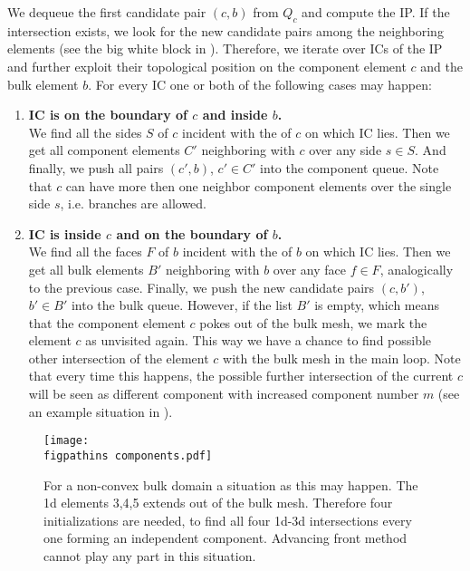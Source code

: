 We dequeue the first candidate pair $(c,b)$ from $Q_c$ and compute the IP.
If the intersection exists, we look for the new candidate pairs among the neighboring elements
(see the big white block in ).
Therefore, we iterate over ICs of the IP and further exploit their topological position on the component element $c$ and the bulk element $b$.
For every IC one or both of the following cases may happen:
\begin{enumerate}[label=(\alph*)]
    \item \textbf{IC is on the boundary of $c$  and inside $b$.} \\
            We find all the sides $S$ of $c$ incident with the \nface of $c$ on which IC lies. Then we get all component
            elements $C'$ neighboring with $c$ over any side $s\in S$. And finally, we push all pairs $(c',b)$, $c'\in C'$ 
            into the component queue. Note that $c$ can have more then one neighbor component elements over the single side $s$, i.e. branches are allowed.
    \item \textbf{IC is inside $c$ and on the boundary of $b$.} \label{enum:prolong2}\\
            We find all the faces $F$ of $b$ incident with the \nface of $b$ on which IC lies. 
            Then we get all bulk elements $B'$ neighboring with $b$ over any face $f\in F$,
            analogically to the previous case.
            Finally, we push the new candidate pairs $(c, b')$, $b'\in B'$ into the bulk queue.
            However, if the list $B'$ is empty, which means that the component element $c$ pokes out of the bulk mesh,
            we mark the element $c$ as unvisited again. This way we have a chance to find possible other intersection of the element
            $c$ with the bulk mesh in the main loop. Note that every time this happens, the possible further intersection 
            of the current $c$ will be seen as different component with increased component number $m$
            (see an example situation in ). 
\end{enumerate}

\begin{figure}[!htb]
    \centering
    \texttt{[image: \\figpathins components.pdf]}
    \caption{For a non-convex bulk domain a situation as this may happen. The 1d elements 3,4,5 extends out of the bulk mesh.
    Therefore four initializations are needed, to find all four 1d-3d intersections every one forming an independent component. 
    Advancing front method cannot play any part in this situation.}
    \label{fig:components}
\end{figure}

